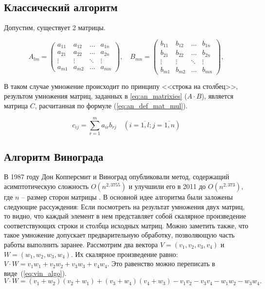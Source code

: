 \subsection{Классический алгоритм}

Допустим, существует 2 матрицы.

\begin{equation}
	\label{eq:an_matrixies}
	A_{lm} = \begin{pmatrix}
		a_{11} & a_{12} & \ldots & a_{1n}\\
		a_{21} & a_{22} & \ldots & a_{2n}\\
		\vdots & \vdots & \ddots & \vdots\\
		a_{m1} & a_{m2} & \ldots & a_{mn}
	\end{pmatrix},
	\quad
	B_{mn} = \begin{pmatrix}
		b_{11} & b_{12} & \ldots & b_{1n}\\
		b_{21} & b_{22} & \ldots & b_{2n}\\
		\vdots & \vdots & \ddots & \vdots\\
		b_{m1} & b_{m2} & \ldots & b_{mn}
	\end{pmatrix},
\end{equation}

В таком случае умножение происходит по принципу <<строка на столбец>>, результом умножения матриц, заданных в
\ref{eq:an_matrixies} ($A \cdot B$), является матрица $C$, расчитанная по формуле (\ref{eq:an_def_mat_mul}).


\begin{equation}
	\label{eq:an_def_mat_mul}
	c_{ij} =
	\sum_{r=1}^{m} a_{ir}b_{rj} \quad (i=\overline{1,l}; j=\overline{1,n})
\end{equation}


\subsection{Алгоритм Винограда}

В 1987 году Дон Копперсмит и Виноград опубликовали метод, 
содержащий асимптотическую сложность $O(n^{2,3755})$ и улучшили 
его в 2011 до $O(n^{2,373})$, где $n$ -- размер сторон матрицы \cite{book_vinograd}.
В основной идее алгоритма были заложены следующие рассуждения:
Если посмотреть на результат умножения двух матриц, 
то видно, 
что каждый элемент в нем представляет собой 
скалярное произведение соответствующих строки и 
столбца исходных матриц. 
Можно заметить также, что такое умножение допускает предварительную 
обработку, позволяющую часть работы выполнить заранее.
Рассмотрим два вектора $V = (v_1, v_2, v_3, v_4)$ и $W = (w_1, w_2, w_3, w_4)$. Их скалярное произведение равно:
$V \cdot W = v_1w_1 + v_2w_2 + v_3w_3 + v_4w_4$.
Это равенство можно переписать в виде~(\ref{eq:vin_algo}).
\begin{equation}
	\label{eq:vin_algo}
	V \cdot W = (v_1 + w_2)(v_2 + w_1) + (v_3 + w_4)(v_4 + w_3) - v_1v_2 - v_3v_4 - w_1w_2 - w_3w_4.	
\end{equation}

